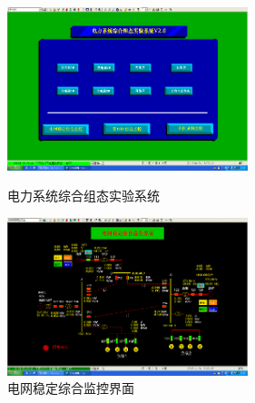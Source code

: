 \documentclass[a4paper]{ctexrep}
\begin{document}
                    \begin{figure}[htbp]
                        \centering
                        \begin{minipage}[t]{0.48\textwidth}
                            \centering
                            \includegraphics[width=7cm]{3.png}
                            \caption{电力系统综合组态实验系统}
                        \end{minipage} 
                        \begin{minipage}[t]{0.48\textwidth}
                            \centering
                            \includegraphics[width=7cm]{4.png}
                            \caption{电网稳定综合监控界面}
                        \end{minipage}
                    \end{figure}
\end{document}
